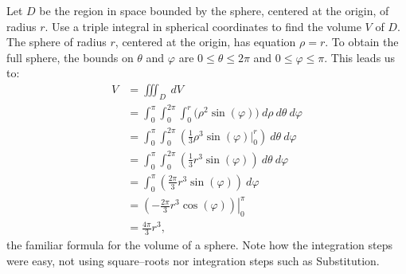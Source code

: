 {Let $D$ be the region in space bounded by the sphere, centered at the origin, of radius $r$. Use a triple integral in spherical coordinates to find the volume $V$ of $D$.}
{The sphere of radius $r$, centered at the origin, has equation $\rho = r$. To obtain the full sphere, the bounds on $\theta$ and $\varphi$ are $0\leq \theta \leq 2\pi$ and $0 \leq \varphi \leq \pi$. This leads us to:
\begin{align*}
V &= \iiint_D\ dV\\
	&= \int_0^{\pi}\int_0^{2\pi}\int_0^r\big(\rho^2\sin(\varphi)\big)\ d\rho\ d\theta\ d\varphi\\
	&= \int_0^\pi\int_0^{2\pi}\left(\frac13\rho^3\sin(\varphi)\Big|_0^r\right)\ d\theta\ d\varphi\\
	&= \int_0^\pi\int_0^{2\pi} \left(\frac13r^3\sin(\varphi)\right)\ d\theta\ d\varphi\\
	&= \int_0^\pi \left(\frac{2\pi}3r^3\sin(\varphi)\right)\ d\varphi\\
	&= \left.\left(-\frac{2\pi}3r^3\cos(\varphi)\right)\right|_0^{\pi}\\
	&= \frac{4\pi}3r^3,
\end{align*}
the familiar formula for the volume of a sphere. Note how the integration steps were easy, not using square--roots nor integration steps such as Substitution.}


